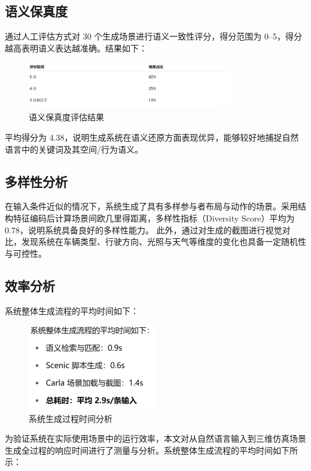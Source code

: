 \subsection{语义保真度}
通过人工评估方式对 30 个生成场景进行语义一致性评分，得分范围为 0–5，得分越高表明语义表达越准确。结果如下：
\begin{figure}[h]
	\centering
	\includegraphics[width=0.8\textwidth]{"images/picture1.pdf"}
	\caption{语义保真度评估结果}
	\label{fig:semantic_fidelity}
\end{figure}

平均得分为 4.38，说明生成系统在语义还原方面表现优异，能够较好地捕捉自然语言中的关键词及其空间/行为语义。

\subsection{多样性分析}
在输入条件近似的情况下，系统生成了具有多样参与者布局与动作的场景。采用结构特征编码后计算场景间欧几里得距离，多样性指标（Diversity Score）平均为 0.78，说明系统具备良好的多样性能力。
此外，通过对生成的截图进行视觉对比，发现系统在车辆类型、行驶方向、光照与天气等维度的变化也具备一定随机性与可控性。

\subsection{效率分析}
系统整体生成流程的平均时间如下：
\begin{figure}[h]
	\centering
	\includegraphics[width=0.5\textwidth]{"images/picture2.pdf"}
	\caption{系统生成过程时间分析}
	\label{fig:efficiency_analysis}
\end{figure}

为验证系统在实际使用场景中的运行效率，本文对从自然语言输入到三维仿真场景生成全过程的响应时间进行了测量与分析。系统整体生成流程的平均时间如下所示：

